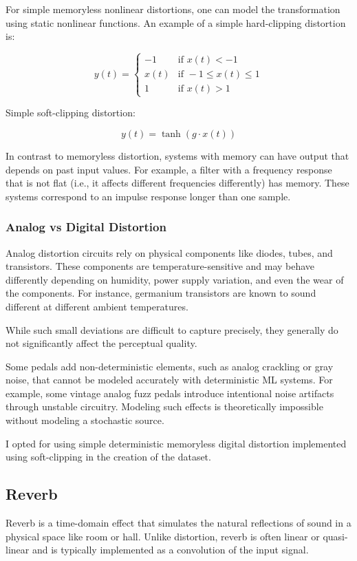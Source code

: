 \documentclass[masterthesis]{fer}
\begin{document}
For simple memoryless nonlinear distortions, one can model the transformation using static nonlinear functions. An example of a simple hard-clipping distortion is:

\begin{equation}
y(t) = 
\begin{cases}
-1 & \text{if } x(t) < -1 \\
x(t) & \text{if } -1 \le x(t) \le 1 \\
1 & \text{if } x(t) > 1
\end{cases}
\end{equation}

Simple soft-clipping distortion:

\begin{equation}
y(t) = \tanh\left( g \cdot x(t) \right)
\end{equation}

In contrast to memoryless distortion, systems with memory can have output that depends on past input values. For example, a filter with a frequency response that is not flat (i.e., it affects different frequencies differently) has memory. These systems correspond to an impulse response longer than one sample.


\subsubsection{Analog vs Digital Distortion}
Analog distortion circuits rely on physical components like diodes, tubes, and transistors. These components are temperature-sensitive and may behave differently depending on humidity, power supply variation, and even the wear of the components. For instance, germanium transistors are known to sound different at different ambient temperatures.

While such small deviations are difficult to capture precisely, they generally do not significantly affect the perceptual quality.

Some pedals add non-deterministic elements, such as analog crackling or gray noise, that cannot be modeled accurately with deterministic ML systems. For example, some vintage analog fuzz pedals introduce intentional noise artifacts through unstable circuitry. Modeling such effects is theoretically impossible without modeling a stochastic source.

I opted for using simple deterministic memoryless digital distortion implemented using soft-clipping in the creation of the dataset.

\subsection{Reverb}
Reverb is a time-domain effect that simulates the natural reflections of sound in a physical space like room or hall. Unlike distortion, reverb is often linear or quasi-linear and is typically implemented as a convolution of the input signal.
\end{document}
